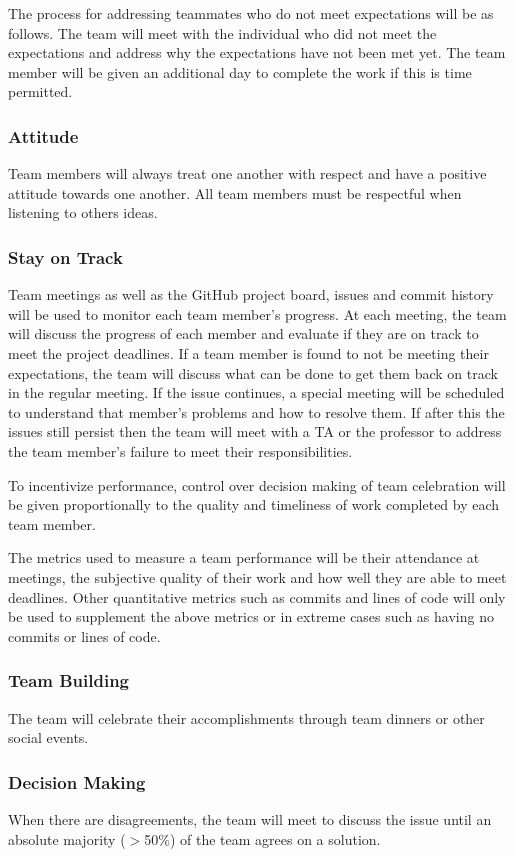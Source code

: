 \documentclass{article}
\begin{document}
The process for addressing teammates who do not meet expectations will be as follows. 
The team will meet with the individual who did not meet the expectations and address why the expectations have not been met yet.  
The team member will be given an additional day to complete the work if this is time permitted. 

\subsubsection*{Attitude}

Team members will always treat one another with respect and have a positive attitude towards one another. 
All team members must be respectful when listening to others ideas. 

\subsubsection*{Stay on Track}

Team meetings as well as the GitHub project board, issues and commit history will be used to monitor each team member's progress.
At each meeting, the team will discuss the progress of each member and evaluate if they are on track to meet the project deadlines.
If a team member is found to not be meeting their expectations, the team will discuss what can be done to get them back on track in the regular meeting.
If the issue continues, a special meeting will be scheduled to understand that member's problems and how to resolve them.
If after this the issues still persist then the team will meet with a TA or the professor to address the team member's failure to meet their responsibilities.

\noindent To incentivize performance, control over decision making of team celebration will be given proportionally to the quality and timeliness of work completed by each team member.

\noindent The metrics used to measure a team performance will be their attendance at meetings, the subjective quality of their work and how well they are able to meet deadlines.
Other quantitative metrics such as commits and lines of code will only be used to supplement the above metrics or in extreme cases such as having no commits or lines of code.
\subsubsection*{Team Building}

The team will celebrate their accomplishments through team dinners or other social events.

\subsubsection*{Decision Making} 

When there are disagreements, the team will meet to discuss the issue until an absolute majority ($>$50\%) of the team agrees on a solution.
\end{document}
